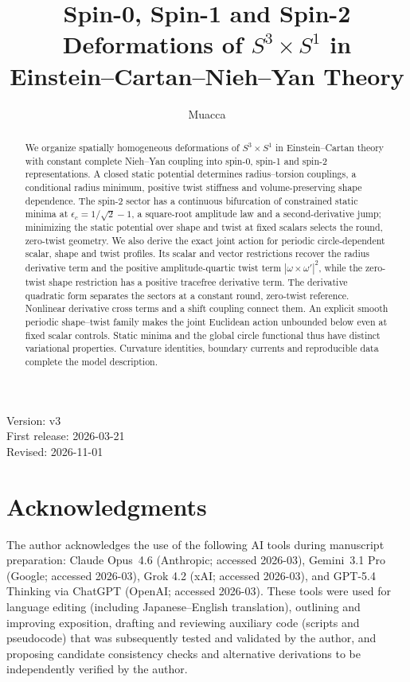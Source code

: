 \documentclass[11pt,a4paper]{article}
\title{Spin-0, Spin-1 and Spin-2 Deformations of $S^3\times S^1$ in Einstein--Cartan--Nieh--Yan Theory}
\author{Muacca}
\date{}
\begin{document}
\maketitle
\begin{center}
Version: v3\\
First release: 2026-03-21\\
Revised: 2026-11-01
\end{center}
\begin{abstract}
We organize spatially homogeneous deformations of $S^3\times S^1$ in Einstein--Cartan theory with constant complete Nieh--Yan coupling into spin-0, spin-1 and spin-2 representations. A closed static potential determines radius--torsion couplings, a conditional radius minimum, positive twist stiffness and volume-preserving shape dependence. The spin-2 sector has a continuous bifurcation of constrained static minima at $\epsilon_c=1/\sqrt2-1$, a square-root amplitude law and a second-derivative jump; minimizing the static potential over shape and twist at fixed scalars selects the round, zero-twist geometry. We also derive the exact joint action for periodic circle-dependent scalar, shape and twist profiles. Its scalar and vector restrictions recover the radius derivative term and the positive amplitude-quartic twist term $|\omega\times\omega'|^2$, while the zero-twist shape restriction has a positive tracefree derivative term. The derivative quadratic form separates the sectors at a constant round, zero-twist reference. Nonlinear derivative cross terms and a shift coupling connect them. An explicit smooth periodic shape--twist family makes the joint Euclidean action unbounded below even at fixed scalar controls. Static minima and the global circle functional thus have distinct variational properties. Curvature identities, boundary currents and reproducible data complete the model description.
\end{abstract}
\setcounter{tocdepth}{1}
\begingroup\small\setlength{\cftbeforesecskip}{2pt}
\tableofcontents
\endgroup
\clearpage








\section*{Acknowledgments}
The author acknowledges the use of the following AI tools during manuscript
preparation: Claude Opus~4.6 (Anthropic; accessed 2026-03),
Gemini~3.1 Pro (Google; accessed 2026-03), Grok 4.2 (xAI; accessed 2026-03),
and GPT-5.4 Thinking via ChatGPT (OpenAI; accessed 2026-03).
These tools were used for language editing (including Japanese--English
translation), outlining and improving exposition, drafting and reviewing
auxiliary code (scripts and pseudocode) that was subsequently tested and
validated by the author, and proposing candidate consistency checks and
alternative derivations to be independently verified by the author.
\end{document}
